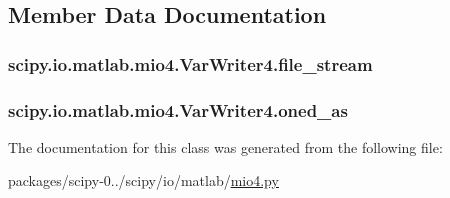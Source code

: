 \subsection{Member Data Documentation}
\hypertarget{classscipy_1_1io_1_1matlab_1_1mio4_1_1VarWriter4_ad60361837adc300555e740a57f1be84a}{}
\subsubsection[{file\+\_\+stream}]{\setlength{\rightskip}{0pt plus 5cm}scipy.\+io.\+matlab.\+mio4.\+Var\+Writer4.\+file\+\_\+stream}\label{classscipy_1_1io_1_1matlab_1_1mio4_1_1VarWriter4_ad60361837adc300555e740a57f1be84a}
\hypertarget{classscipy_1_1io_1_1matlab_1_1mio4_1_1VarWriter4_a798dce4d325299148b0f7381ac678d6b}{}
\subsubsection[{oned\+\_\+as}]{\setlength{\rightskip}{0pt plus 5cm}scipy.\+io.\+matlab.\+mio4.\+Var\+Writer4.\+oned\+\_\+as}\label{classscipy_1_1io_1_1matlab_1_1mio4_1_1VarWriter4_a798dce4d325299148b0f7381ac678d6b}


The documentation for this class was generated from the following file\+:\begin{DoxyCompactItemize}
\item 
packages/scipy-\/0../scipy/io/matlab/\hyperlink{mio4_8py}{mio4.\+py}\end{DoxyCompactItemize}
